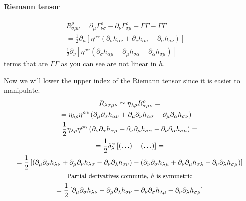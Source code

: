 \paragraph{Riemann tensor}
\begin{align}
	R^{\rho }_{\sigma \mu \nu } = \partial_{\mu }\Gamma ^{\rho }_{ \nu \sigma  } - \partial_{\nu }\Gamma ^{\rho }_{\sigma \mu } + \Gamma \Gamma -\Gamma \Gamma  = \nonumber\\
				    = \frac{1}{2} \partial_{\mu } \left[ \eta ^{\rho \alpha }\left( \partial_{\sigma} h_{\alpha \nu }+ \partial_{\nu }h_{\alpha \sigma }- \partial_{\alpha }h_{\sigma \nu } \right) \right] - \nonumber\\
				     \frac{1}{2}\partial_{\nu }\left[ \eta ^{\rho \alpha }\left( \partial_{\sigma }h_{\alpha \mu } +\partial_{\mu }h_{\sigma \alpha }- \partial_{\alpha }h_{\sigma \mu } \right) \right] \nonumber
\end{align}
terms that are $\Gamma \Gamma $ as you can see are not linear in $h$.\par
Now we will lower the upper index of the Riemann tensor since it is easier to manipulate.
\begin{gather}
	R_{\lambda \sigma \mu \nu } \simeq \eta _{\lambda \rho }R^{\rho }_{\sigma \mu \nu } = \nonumber \\
	 =  \eta _{\lambda \rho }\eta ^{\rho \alpha } \left( \partial_{\mu }\partial_{\sigma }h _{\alpha \nu } + \partial_{\mu }\partial_{\nu }h_{\alpha \sigma }-\partial_{\mu }\partial_{\alpha }h_{\sigma \nu } \right) - \nonumber\\
	  \frac{1}{2}\eta _{\lambda \rho }\eta ^{\rho \alpha }\left( \partial_{\nu }\partial_{\sigma }h_{\alpha \mu } + \partial_{\nu }\partial_{\mu }h_{\sigma \alpha }-\partial_{\nu }\partial_{\alpha }h_{\sigma \mu } \right) =  \nonumber\\
	  = \frac{1}{2} \delta ^{\alpha }_{\lambda }\left[ \left( \ldots  \right) - \left( \ldots  \right) \right] = \nonumber\\
	  = \frac{1}{2} \left[ \left( \partial_{\mu }\partial_{\sigma }h_{\lambda \nu } +\partial_{\mu }\partial_{\nu }h_{\lambda \sigma }-\partial_{\nu }\partial_{\lambda }h_{\sigma \nu } \right) - \left( \partial_{\nu }\partial_{\sigma }h_{\lambda \mu }+ \partial_{\nu }\partial_{\mu }h_{\sigma \lambda } - \partial_{\nu }\partial_{\lambda }h_{\sigma \mu } \right) \right] \nonumber\\
	 \text{ {\small Partial derivatives commute, \emph{h} is symmetric }} \nonumber\\
	 = \frac{1}{2} \left[ \partial_{\mu }\partial_{\sigma }h_{\lambda \nu }-\partial_{\mu }\partial_{\lambda }h_{\sigma \nu } - \partial_{\nu }\partial_{\sigma }h_{\lambda \mu } + \partial_{\nu }\partial_{\lambda }h_{\sigma \mu } \right]
\end{gather}
